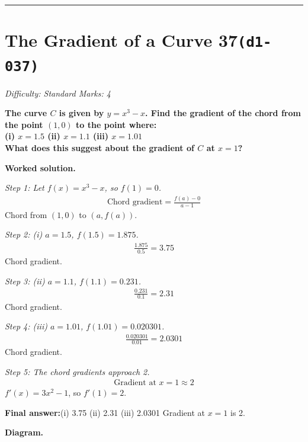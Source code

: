 \documentclass[11pt]{article}
\newcommand{\question}[1]{\par\medskip\noindent\textbf{#1}\par}
\begin{document}
\medskip\hrule

\section*{The Gradient of a Curve 37\quad\small\texttt{(d1-037)}}
\textit{Difficulty: Standard \quad\textbar\quad Marks: 4}

\question{The curve \( C \) is given by \( y = x^3 - x \). Find the gradient of the chord from the point \( (1, 0) \) to the point where:\\[3pt]  (i) \( x = 1.5 \) \quad  (ii) \( x = 1.1 \) \quad  (iii) \( x = 1.01 \)\\[3pt]  What does this suggest about the gradient of \( C \) at \( x = 1 \)?}

\textbf{Worked solution.}

\textit{Step 1: Let \( f(x) = x^3 - x \), so \( f(1) = 0 \).}
\[\begin{gathered}
\text{Chord gradient} = \frac{f(a) - 0}{a - 1}
\end{gathered}\]
Chord from \( (1, 0) \) to \( (a, f(a)) \).

\textit{Step 2: (i) \( a = 1.5 \), \( f(1.5) = 1.875 \).}
\[\begin{gathered}
\frac{1.875}{0.5} = 3.75
\end{gathered}\]
Chord gradient.

\textit{Step 3: (ii) \( a = 1.1 \), \( f(1.1) = 0.231 \).}
\[\begin{gathered}
\frac{0.231}{0.1} = 2.31
\end{gathered}\]
Chord gradient.

\textit{Step 4: (iii) \( a = 1.01 \), \( f(1.01) = 0.020301 \).}
\[\begin{gathered}
\frac{0.020301}{0.01} = 2.0301
\end{gathered}\]
Chord gradient.

\textit{Step 5: The chord gradients approach 2.}
\[\begin{gathered}
\text{Gradient at } x = 1 \approx 2
\end{gathered}\]
\( f'(x) = 3x^2 - 1 \), so \( f'(1) = 2 \).

\begin{answerbox}
\textbf{Final answer:}\quad (i) 3.75 \quad  (ii) 2.31 \quad  (iii) 2.0301 \quad  Gradient at \(\displaystyle  x = 1 \) is 2.
\end{answerbox}
\textbf{Diagram.}
\end{document}
